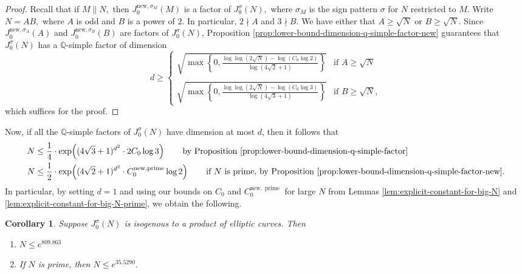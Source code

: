 \documentclass[11pt,letterpaper,reqno]{amsart}
\newtheorem{corollary}[theorem]{Corollary}
\theoremstyle{definition}
\numberwithin{equation}{section}
\numberwithin{figure}{section}
\numberwithin{table}{section}
\newcommand{\QQ}{\mathbb{Q}}
\newcommand{\nw}{\mathrm{new}}
\begin{document}
\begin{proof}
Recall that if $M \| N,$ then $J_0^{\nw, \sigma_M}(M)$ is a factor of $J_0^\sigma(N),$ where $\sigma_M$ is the sign pattern $\sigma$ for $N$ restricted to $M$. Write $N = AB,$ where $A$ is odd and $B$ is a power of $2.$ In particular, $2 \nmid A$ and $3 \nmid B.$ We have either that $A \geq \sqrt{N}$ or $B \geq \sqrt{N}.$ Since $J_0^{\nw, \sigma_A}(A)$ and $J_0^{\nw, \sigma_B}(B)$ are factors of $J_0^\sigma(N)$, Proposition \ref{prop:lower-bound-dimension-q-simple-factor-new} guarantees that $J_0^\sigma(N)$ has a $\mathbb{Q}$-simple factor of dimension
$$d \geq \begin{cases}
    \sqrt{\max \left\{ 0, \frac{\log \log (2 \sqrt{N} ) - \log (C_0 \log 2)}{\log (4\sqrt{2} + 1)} \right\}} & \text{if $A \geq \sqrt{N}$}\\
    &\\
    \sqrt{\max \left\{ 0, \frac{\log \log (2 \sqrt{N} ) - \log (C_0 \log 3)}{\log (4\sqrt{3} + 1)} \right\} } & \text{if $B \geq \sqrt{N}$},
\end{cases}$$
which suffices for the proof.
\end{proof}



Now, if all the $\QQ$-simple factors of $J_0^{\sigma}(N)$ have dimension at most $d$, then it follows that
\begin{align}
    N &\leq \frac{1}{4} \cdot \exp\! \left( (4\sqrt{3} + 1)^{d^2} \cdot 2C_0 \log 3 \right) \qquad \text{by Proposition \ref{prop:lower-bound-dimension-q-simple-factor}}\\
    N &\leq \frac{1}{2} \cdot \exp\! \left( (4\sqrt{2} + 1)^{d^2} \cdot C_0^{\nw, \text{prime}} \log 2 \right) \qquad \text{if $N$ is prime, by Proposition \ref{prop:lower-bound-dimension-q-simple-factor-new}}.
\end{align}
In particular, by setting $d = 1$ and using our bounds on $C_0$ and $C_0^{\nw, \operatorname{prime}}$ for large $N$ from Lemmas \ref{lem:explicit-constant-for-big-N} and \ref{lem:explicit-constant-for-big-N-prime}, we obtain the following.

\begin{corollary} \label{cor:J0sigma-isogenous-to-product-elliptic-curves}
Suppose $J_0^\sigma(N)$ is isogenous to a product of elliptic curves. Then
\begin{enumerate}
    \item $N \leq e^{809.863}$
    \item If $N$ is prime, then $N \leq e^{35.5290}.$
\end{enumerate}
\end{corollary}
\end{document}
